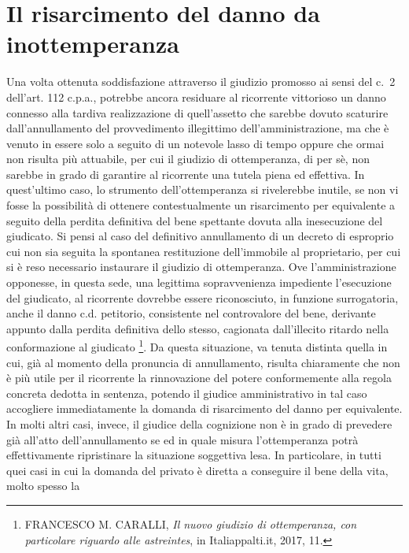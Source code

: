 \documentclass[12pt,it,a4paper,]{report}
\begin{document}
\hypertarget{il-risarcimento-del-danno-da-inottemperanza}{%
\section{Il risarcimento del danno da
inottemperanza}\label{il-risarcimento-del-danno-da-inottemperanza}}

Una volta ottenuta soddisfazione attraverso il giudizio promosso ai
sensi del c.~2 dell'art. 112 c.p.a., potrebbe ancora residuare al
ricorrente vittorioso un danno connesso alla tardiva realizzazione di
quell'assetto che sarebbe dovuto scaturire dall'annullamento del
provvedimento illegittimo dell'amministrazione, ma che è venuto in
essere solo a seguito di un notevole lasso di tempo oppure che ormai non
risulta più attuabile, per cui il giudizio di ottemperanza, di per sè,
non sarebbe in grado di garantire al ricorrente una tutela piena ed
effettiva. In quest'ultimo caso, lo strumento dell'ottemperanza si
rivelerebbe inutile, se non vi fosse la possibilità di ottenere
contestualmente un risarcimento per equivalente a seguito della perdita
definitiva del bene spettante dovuta alla inesecuzione del giudicato. Si
pensi al caso del definitivo annullamento di un decreto di esproprio cui
non sia seguita la spontanea restituzione dell'immobile al proprietario,
per cui si è reso necessario instaurare il giudizio di ottemperanza. Ove
l'amministrazione opponesse, in questa sede, una legittima
sopravvenienza impediente l'esecuzione del giudicato, al ricorrente
dovrebbe essere riconosciuto, in funzione surrogatoria, anche il danno
c.d. petitorio, consistente nel controvalore del bene, derivante appunto
dalla perdita definitiva dello stesso, cagionata dall'illecito ritardo
nella conformazione al giudicato \footnote{FRANCESCO M. CARALLI,
  \emph{Il nuovo giudizio di ottemperanza, con particolare riguardo alle
  astreintes}, in Italiappalti.it, 2017, 11.}. Da questa situazione, va
tenuta distinta quella in cui, già al momento della pronuncia di
annullamento, risulta chiaramente che non è più utile per il ricorrente
la rinnovazione del potere conformemente alla regola concreta dedotta in
sentenza, potendo il giudice amministrativo in tal caso accogliere
immediatamente la domanda di risarcimento del danno per equivalente. In
molti altri casi, invece, il giudice della cognizione non è in grado di
prevedere già all'atto dell'annullamento se ed in quale misura
l'ottemperanza potrà effettivamente ripristinare la situazione
soggettiva lesa. In particolare, in tutti quei casi in cui la domanda
del privato è diretta a conseguire il bene della vita, molto spesso la
\end{document}
